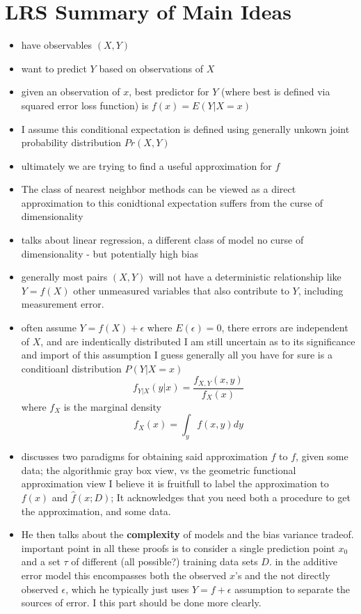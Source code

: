 \documentclass[a4paper]{report}
\newcommand{\gray}{\color{gray}}
\newcommand{\<}{\textless}
\renewcommand{\>}{\textgreater}
\begin{document}
\section{LRS Summary of Main Ideas}
\begin{itemize}
  \item have observables $(X,Y)$
  \item want to predict $Y$ based on observations of $X$
  \item given an observation of $x$, best predictor for $Y$ (where best is defined via squared error loss function) is $f(x) = E(Y | X = x)$
  \item I assume this conditional expectation is defined using generally unkown joint probability distribution $Pr(X,Y)$
  \item ultimately we are trying to find a useful approximation for $f$
  \item The class of nearest neighbor methods can be viewed as a direct approximation to this conidtional expectation
    \subitem suffers from the curse of dimensionality
  \item talks about linear regression, a different class of model
    \subitem no curse of dimensionality - but potentially high bias
  \item generally most pairs $(X,Y)$ will not have a deterministic relationship like $Y = f(X)$
    \subitem other unmeasured variables that also contribute to $Y$, including measurement error.
  \item often assume $Y = f(X) + \epsilon$ where $E(\epsilon) = 0$, there errors are independent of $X$, and are indentically distributed
    \subitem I am still uncertain as to its significance and import of this assumption {\gray
    \subitem I guess generally all you have for sure is a conditioanl distribution $P(Y | X = x)$
    $$ f_{Y|X}(y|x) = \frac{f_{X,Y}(x,y)}{f_X(x)} $$
    where $f_X$ is the marginal density 
  $$f_X(x) = \int_y f(x,y)dy $$ }
  \item discusses two paradigms for obtaining said approximation $\hat{f}$ to $f$, given some data; the algorithmic gray box view, vs the geometric functional approximation view
    \subitem I believe it is fruitfull to label the approximation to $f(x)$ and $\hat{f}(x;D)$; It acknowledges that you need both a procedure to get the approximation, and some data.
  \item He then talks about the {\bf complexity} of models and the bias variance tradeof.
    \subitem important point in all these proofs is to consider a single prediction point $x_0$ and a set $\tau$ of different (all possible?) training data sets $D$.
    \subitem in the additive error model this encompasses both the observed $x$'s and the not directly observed $\epsilon$, which he typically just uses $Y = f + \epsilon$ assumption to separate the sources of error.
    \subitem I this part should be done more clearly.
\end{itemize}
\end{document}
